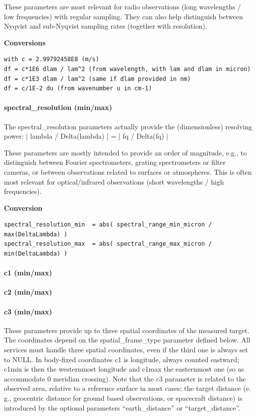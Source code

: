 \documentclass[11pt,a4paper]{ivoa}
\begin{document}
These parameters are most relevant for radio observations (long wavelengths / low frequencies) with regular sampling. They can also help distinguish between Nyqvist and sub-Nyqvist sampling rates (together with resolution).


\textbf{Conversions}

\begin{verbatim}
with c = 2.99792458E8 (m/s)
df = c*1E6 dlam / lam^2 (from wavelength, with lam and dlam in micron)
df = c*1E3 dlam / lam^2 (same if dlam provided in nm)
df = c/1E-2 du (from wavenumber u in cm-1)
\end{verbatim}

\paragraph{spectral\_resolution (min/max)}

The spectral\_resolution parameters actually provide the (dimensionless) resolving power: | lambda / Delta(lambda) | = | fq / Delta(fq) |  

These parameters are mostly intended to provide an order of magnitude, e.g., to distinguish between Fourier spectrometers, grating spectrometers or filter cameras, or between observations related to surfaces or atmospheres. This is often most relevant for optical/infrared observations (short wavelengths / high frequencies).


\textbf{Conversion}

\begin{verbatim}
spectral_resolution_min  = abs( spectral_range_min_micron / max(DeltaLambda) )
spectral_resolution_max  = abs( spectral_range_max_micron / min(DeltaLambda) )
\end{verbatim}

\paragraph{c1 (min/max)}

\paragraph{c2 (min/max)}

\paragraph{c3 (min/max)}

These parameters provide up to three spatial coordinates of the measured target. The coordinates depend on the spatial\_frame\_type parameter defined below. All services must handle three spatial coordinates, even if the third one is always set to NULL. In body-fixed coordinates c1 is longitude, always counted eastward; c1min is then the westernmost longitude and c1max the easternmost one (so as accommodate 0 meridian crossing). Note that the c3 parameter is related to the observed area, relative to a reference surface in most cases; the target distance (e. g., geocentric distance for ground based observations, or spacecraft distance) is introduced by the optional parameters  ``earth\_distance'' or ``target\_distance''.
\end{document}
